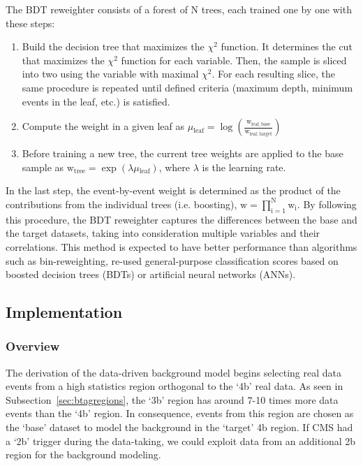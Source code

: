 The BDT reweighter consists of a forest of N trees, each trained one by one with these steps:
\begin{enumerate}
\item Build the decision tree that maximizes the $\chi^{2}$ function. It determines the cut that maximizes the $\chi^{2}$ function for each variable. Then, the sample is sliced into two using the variable with maximal $\chi^{2}$. For each resulting slice, the same procedure is repeated until defined criteria (maximum depth, minimum events in the leaf, etc.) is satisfied.  
\item Compute the weight in a given leaf as $\mu\mathrm{_{leaf}= \log \left(\frac{ w_{leaf,base} }{ w_{leaf,target} }\right)  }$
\item Before training a new tree, the current tree weights are applied to the base sample as $\mathrm{w_{tree}=}\exp(\lambda\mu\mathrm{_{leaf}})$, where $\lambda$ is the learning rate.  
\end{enumerate}

In the last step, the event-by-event weight is determined as the product of the contributions from the individual trees  (i.e. boosting), $\mathrm{w=\displaystyle \prod_{i=1}^{ \mathrm{N} } w_{i}}$. By following this procedure, the BDT reweighter captures the differences between the base and the target datasets, taking into consideration multiple variables and their correlations. This method is expected to have better performance than algorithms such as bin-reweighting, re-used general-purpose classification scores based on boosted decision trees (BDTs) or artificial neural networks  (ANNs).

\subsection{Implementation} \label{subsec:imp}
\subsubsection{Overview} \label{subsub:bkgoverview}

The derivation of the data-driven background model begins selecting real data events from a high statistics region orthogonal to the `4b' real data. As seen in Subsection~\ref{sec:btagregions}, the `3b' region has around 7-10 times more data events than the `4b' region. In consequence, events from this region are chosen as the `base' dataset to model the background in the `target' 4b region. If CMS had a `2b' trigger during the data-taking, we could exploit data from an additional 2b region for the background modeling. 

